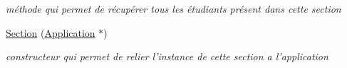 \begin{DoxyCompactItemize}
\begin{DoxyCompactList}\small\item\em méthode qui permet de récupérer tous les étudiants présent dans cette section \end{DoxyCompactList}\item 
\hypertarget{class_section_a1842f51fc609776feca3df6d45ce0ba1}{\hyperlink{class_section_a1842f51fc609776feca3df6d45ce0ba1}{Section} (\hyperlink{class_application}{Application} $\ast$)}\label{class_section_a1842f51fc609776feca3df6d45ce0ba1}

\begin{DoxyCompactList}\small\item\em constructeur qui permet de relier l'instance de cette section a l'application \end{DoxyCompactList}\end{DoxyCompactItemize}
